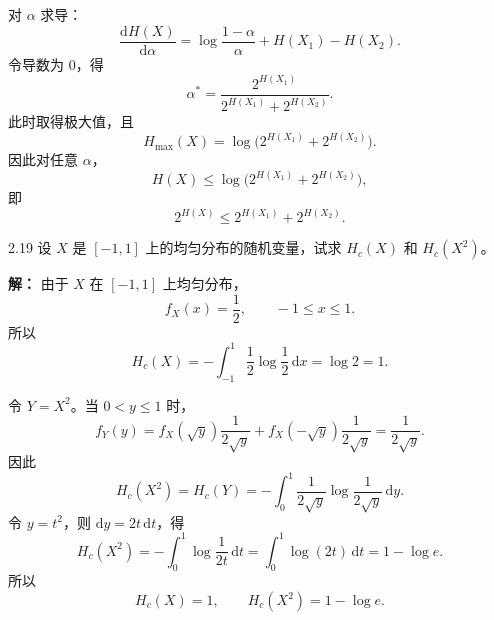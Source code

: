 \documentclass[UTF8,11pt,a4paper]{ctexart}
\begin{document}
对 $\alpha$ 求导：
\[
\frac{\mathrm{d}H(X)}{\mathrm{d}\alpha}
=\log\frac{1-\alpha}{\alpha}+H(X_1)-H(X_2).
\]
令导数为 $0$，得
\[
\alpha^\ast=\frac{2^{H(X_1)}}{2^{H(X_1)}+2^{H(X_2)}}.
\]
此时取得极大值，且
\[
H_{\max}(X)=\log\!\bigl(2^{H(X_1)}+2^{H(X_2)}\bigr).
\]
因此对任意 $\alpha$，
\[
H(X)\le \log\!\bigl(2^{H(X_1)}+2^{H(X_2)}\bigr),
\]
即
\[
2^{H(X)}\le 2^{H(X_1)}+2^{H(X_2)}.
\]

\vspace{0.8em}

\begin{problem}{2.19}
设 $X$ 是 $[-1,1]$ 上的均匀分布的随机变量，试求 $H_c(X)$ 和 $H_c(X^2)$。
\end{problem}
\noindent\textbf{解：}
由于 $X$ 在 $[-1,1]$ 上均匀分布，
\[
f_X(x)=\frac12,\qquad -1\le x\le 1.
\]
所以
\[
H_c(X)=-\int_{-1}^{1}\frac12\log\frac12\,\mathrm{d}x=\log 2=1.
\]

令 $Y=X^2$。当 $0<y\le 1$ 时，
\[
f_Y(y)=f_X(\sqrt y)\frac{1}{2\sqrt y}
      +f_X(-\sqrt y)\frac{1}{2\sqrt y}
      =\frac{1}{2\sqrt y}.
\]
因此
\[
H_c(X^2)=H_c(Y)
=-\int_0^1\frac{1}{2\sqrt y}\log\frac{1}{2\sqrt y}\,\mathrm{d}y.
\]
令 $y=t^2$，则 $\mathrm{d}y=2t\,\mathrm{d}t$，得
\[
H_c(X^2)
=-\int_0^1\log\frac{1}{2t}\,\mathrm{d}t
=\int_0^1\log(2t)\,\mathrm{d}t
=1-\log e.
\]
所以
\[
H_c(X)=1,\qquad H_c(X^2)=1-\log e.
\]

\vspace{0.8em}
\end{document}
